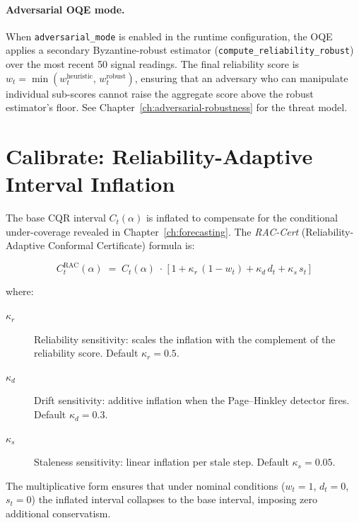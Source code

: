 \paragraph{Adversarial OQE mode.}
When \texttt{adversarial\_mode} is enabled in the runtime configuration,
the OQE applies a secondary Byzantine-robust estimator
(\texttt{compute\_reliability\_robust}) over the most recent 50 signal
readings.  The final reliability score is
$w_t = \min(w_t^{\mathrm{heuristic}},\, w_t^{\mathrm{robust}})$,
ensuring that an adversary who can manipulate individual sub-scores
cannot raise the aggregate score above the robust estimator's floor.
See Chapter~\ref{ch:adversarial-robustness} for the threat model.

\section{Calibrate: Reliability-Adaptive Interval Inflation}
\label{sec:calibrate}

The base CQR interval $C_t(\alpha)$ is inflated to compensate for the
conditional under-coverage revealed in Chapter~\ref{ch:forecasting}.  The
\emph{RAC-Cert} (Reliability-Adaptive Conformal Certificate) formula is:

\begin{equation}
\label{eq:rac-cert}
\boxed{
  C_t^{\mathrm{RAC}}(\alpha) \;=\;
  C_t(\alpha) \;\cdot\;
  \bigl[\,1 + \kappa_r\,(1 - w_t)
             + \kappa_d\,d_t
             + \kappa_s\,s_t\,\bigr]
}
\end{equation}

where:
\begin{description}
  \item[$\kappa_r$] Reliability sensitivity: scales the inflation with the
    complement of the reliability score.  Default $\kappa_r = 0.5$.
  \item[$\kappa_d$] Drift sensitivity: additive inflation when the
    Page--Hinkley detector fires.  Default $\kappa_d = 0.3$.
  \item[$\kappa_s$] Staleness sensitivity: linear inflation per stale step.
    Default $\kappa_s = 0.05$.
\end{description}

The multiplicative form ensures that under nominal conditions
($w_t = 1$, $d_t = 0$, $s_t = 0$) the inflated interval collapses to the
base interval, imposing zero additional conservatism.

